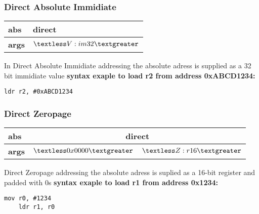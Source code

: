 \documentclass{article}
\begin{document}
	\subsubsection*{Direct Absolute Immidiate}
	\begin{table}[H]
		\centering
		\begin{tabular}{|p{2cm}|p{4cm}|}
		\hline
		\textbf{abs} & direct \\
		\hline
		\textbf{args} & \(\textless V:im32 \textgreater\) \\
		\hline
		\end{tabular}
	\end{table}
	In Direct Absolute Immidiate addressing the absolute adress is
	supplied as a 32 bit immidiate value
	\newline
	\textbf{syntax exaple to load r2 from address 0xABCD1234:}
	\newline
	\begin{needspace}{\baselineskip}
	\begin{lstlisting}[language=ASM, label={lst:armcode}]
	ldr r2, #0xABCD1234
	\end{lstlisting}
	\end{needspace}

	\subsubsection*{Direct Zeropage}
	\begin{table}[H]
		\centering
		\begin{tabular}{|p{2cm}|p{2cm}|p{2cm}|}
		\hline
		\textbf{abs} & \multicolumn{2}{|c|}{direct} \\
		\hline
		\textbf{args} & \(\textless 0x0000 \textgreater\) & \(\textless Z:r16 \textgreater\) \\
		\hline
		\end{tabular}
	\end{table}
	Direct Zeropage addressing the absolute adress is
	suplied as a 16-bit register and padded with 0s
	\newline
	\textbf{syntax exaple to load r1 from address 0x1234:}
	\newline
	\begin{needspace}{\baselineskip}
	\begin{lstlisting}[language=ASM, label={lst:armcode}]
	mov r0, #1234
	ldr r1, r0
	\end{lstlisting}
	\end{needspace}
\end{document}
